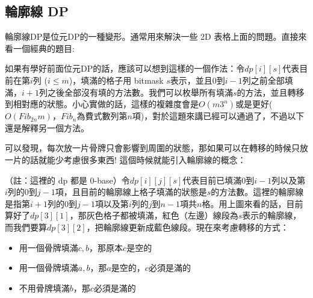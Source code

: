 \documentclass[main.tex]{subfiles}
\begin{document}
    \subsection{輪廓線 DP}
        \par 輪廓線DP是位元DP的一種變形。通常用來解決一些 2D 表格上面的問題。直接來看一個經典的題目:
        
        如果有學好前面位元DP的話，應該可以想到這樣的一個作法：令$dp[i][s]$代表目前在第$i$列 ($i \leq m$)，填滿的格子用 bitmask $s$表示，並且$0$到$i-1$列之前全部填滿，$i+1$列之後全部沒有填的方法數。我們可以枚舉所有填滿$s$的方法，並且轉移到相對應的狀態。小心實做的話，這樣的複雜度會是$O(m3^n)$或是更好($O(Fib_{2n} m)$，$Fib_n$為費式數列第$n$項)，對於這題來講已經可以通過了，不過以下還是解釋另一個方法。
        \par 可以發現，每次放一片骨牌只會影響到周圍的狀態，那如果可以在轉移的時候只放一片的話就能少考慮很多東西! 這個時候就能引入輪廓線的概念：
        \smallskip
        \begin{center}
        \end{center}
        \par （註：這裡的 dp 都是 0-base）令$dp[i][j][s]$代表目前已填滿$0$到$i-1$列以及第$i$列的$0$到$j-1$項，且目前的輪廓線上格子填滿的狀態是$s$的方法數。這裡的輪廓線是指第$i+1$列的$0$到$j-1$項以及第$i$列的$j$到$n-1$項共$n$格。用上圖來看的話，目前算好了$dp[3][1]$，那灰色格子都被填滿，紅色（左邊）線段為$s$表示的輪廓線，而我們要算$dp[3][2]$，把輪廓線更新成藍色線段。現在來考慮轉移的方式：
        \begin{itemize}
            \item 用一個骨牌填滿$c, b$，那原本$c$是空的
            \item 用一個骨牌填滿$a, b$，那$a$是空的，$c$必須是滿的
            \item 不用骨牌填滿$b$，那$c$必須是滿的
        \end{itemize}
\end{document}
